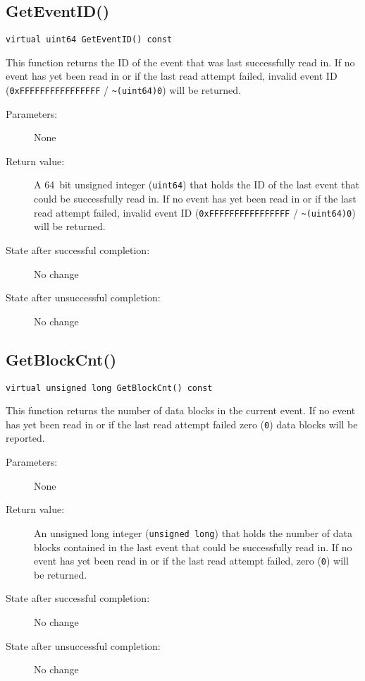 \documentclass[a4paper,twoside]{article}
\begin{document}
\subsection{GetEventID()}
\label{Subsec:MonitoringReader::GetEventID}
\texttt{virtual uint64 GetEventID() const}

This function returns the ID of the event that was last successfully read in. If no event has yet been read in or if the last read attempt failed, 
invalid event ID (\texttt{0xFF\-FF\-FF\-FF\-FF\-FF\-FF\-FF} / \texttt{\~{ }(uint64)0}) will be returned.

\begin{description}
\item[Parameters:] None
\item[Return value:] A 64~bit unsigned integer (\texttt{uint64}) that holds the ID of the last event that could be successfully read in. If no event has yet been read in or if the last read attempt failed, 
invalid event ID (\texttt{0xFF\-FF\-FF\-FF\-FF\-FF\-FF\-FF} / \texttt{\~{ }(uint64)0}) will be returned.
\item[State after successful completion:] No change
\item[State after unsuccessful completion:] No change
\end{description}


\subsection{GetBlockCnt()}
\label{Subsec:MonitoringReader::GetBlockCnt}
\texttt{virtual unsigned long GetBlockCnt() const}

This function returns the number of data blocks in the current event. If no event has yet been read in or if the last read attempt failed 
zero (\texttt{0}) data blocks will be reported.

\begin{description}
\item[Parameters:] None
\item[Return value:] An  unsigned long integer (\texttt{unsigned long}) that holds the number of data blocks contained in the last event that could be successfully read in. 
If no event has yet been read in or if the last read attempt failed, zero (\texttt{0}) will be returned.
\item[State after successful completion:] No change
\item[State after unsuccessful completion:] No change
\end{description}
\end{document}
